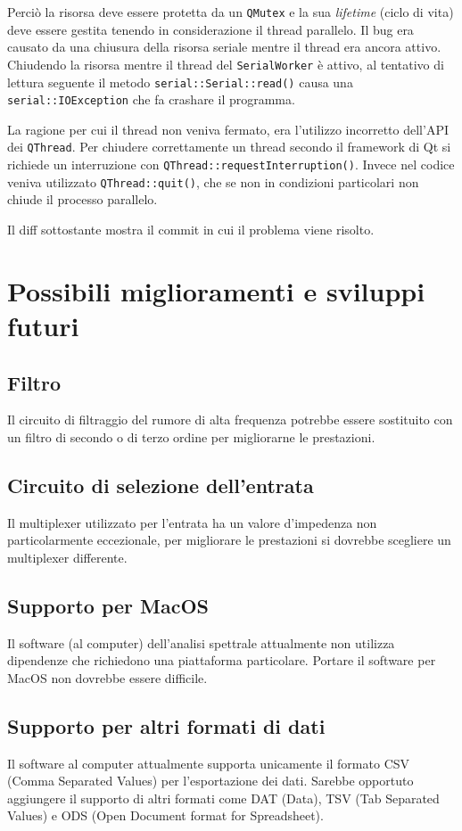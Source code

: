 Perci\`o la risorsa deve essere protetta da un \texttt{QMutex} e la sua
\emph{lifetime} (ciclo di vita) deve essere gestita tenendo in considerazione
il thread parallelo.  Il bug era causato da una chiusura della risorsa seriale
mentre il thread era ancora attivo.  Chiudendo la risorsa mentre il thread del
\texttt{SerialWorker} \`e attivo, al tentativo di lettura seguente il metodo
\texttt{serial::Serial::read()} causa una \texttt{serial::IOException} che fa
crashare il programma.

La ragione per cui il thread non veniva fermato, era l'utilizzo incorretto
dell'API dei \texttt{QThread}. Per chiudere correttamente un thread secondo il
framework di Qt si richiede un interruzione con
\texttt{QThread::requestInterruption()}. Invece nel codice veniva utilizzato
\texttt{QThread::quit()}, che se non in condizioni particolari non chiude il
processo parallelo.

Il diff  sottostante mostra il commit in cui il problema viene risolto.


\section{Possibili miglioramenti e sviluppi futuri}
\subsection{Filtro}
Il circuito di filtraggio del rumore di alta frequenza potrebbe essere
sostituito con un filtro di secondo o di terzo ordine per migliorarne le
prestazioni.

\subsection{Circuito di selezione dell'entrata}
Il multiplexer utilizzato per l'entrata ha un valore d'impedenza non
particolarmente eccezionale, per migliorare le prestazioni si dovrebbe
scegliere un multiplexer differente.

\subsection{Supporto per MacOS}
Il software (al computer) dell'analisi spettrale attualmente non utilizza
dipendenze che richiedono una piattaforma particolare. Portare il software per
MacOS non dovrebbe essere difficile.


\subsection{Supporto per altri formati di dati}
Il software al computer attualmente supporta unicamente il formato CSV (Comma
Separated Values) per l'esportazione dei dati. Sarebbe opportuto aggiungere il
supporto di altri formati come DAT (Data), TSV (Tab Separated Values) e ODS
(Open Document format for Spreadsheet).

